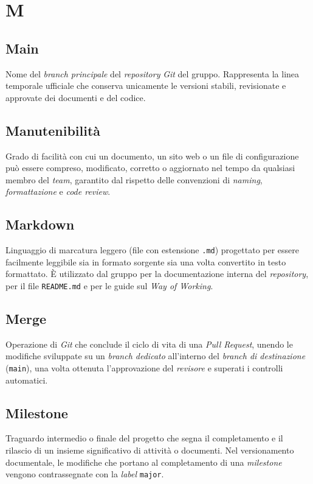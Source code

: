 \documentclass[11pt, a4paper]{article}
\begin{document}
\section*{M}

\subsection*{Main}
Nome del \textit{branch principale} del \textit{repository} \textit{Git} del gruppo. Rappresenta la linea temporale ufficiale che conserva unicamente le versioni stabili, revisionate e approvate dei documenti e del codice.

\subsection*{Manutenibilità}
Grado di facilità con cui un documento, un sito web o un file di configurazione può essere compreso, modificato, corretto o aggiornato nel tempo da qualsiasi membro del \textit{team}, garantito dal rispetto delle convenzioni di \textit{naming}, \textit{formattazione} e \textit{code review}.

\subsection*{Markdown}
Linguaggio di marcatura leggero (file con estensione \texttt{.md}) progettato per essere facilmente leggibile sia in formato sorgente sia una volta convertito in testo formattato. È utilizzato dal gruppo per la documentazione interna del \textit{repository}, per il file \texttt{README.md} e per le guide sul \textit{Way of Working}.

\subsection*{Merge}
Operazione di \textit{Git} che conclude il ciclo di vita di una \textit{Pull Request}, unendo le modifiche sviluppate su un \textit{branch dedicato} all'interno del \textit{branch di destinazione} (\texttt{main}), una volta ottenuta l'approvazione del \textit{revisore} e superati i controlli automatici.

\subsection*{Milestone}
Traguardo intermedio o finale del progetto che segna il completamento e il rilascio di un insieme significativo di attività o documenti. Nel versionamento documentale, le modifiche che portano al completamento di una \textit{milestone} vengono contrassegnate con la \textit{label} \texttt{major}.
\end{document}
